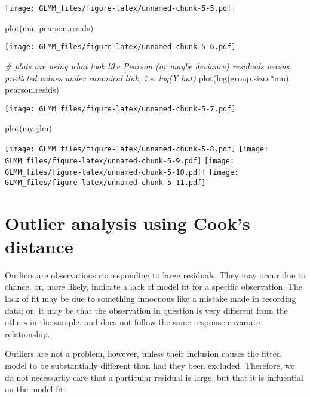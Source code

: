 \documentclass[
]{book}
\newenvironment{Shaded}{\begin{snugshade}}{\end{snugshade}}
\newcommand{\CommentTok}[1]{\textcolor[rgb]{0.56,0.35,0.01}{\textit{#1}}}
\newcommand{\FunctionTok}[1]{\textcolor[rgb]{0.00,0.00,0.00}{#1}}
\newcommand{\NormalTok}[1]{#1}
\newcommand{\SpecialCharTok}[1]{\textcolor[rgb]{0.00,0.00,0.00}{#1}}
\begin{document}
\texttt{[image: GLMM\_files/figure-latex/unnamed-chunk-5-5.pdf]}

\begin{Shaded}
\begin{Highlighting}[]
\FunctionTok{plot}\NormalTok{(mu, pearson.resids)}
\end{Highlighting}
\end{Shaded}

\texttt{[image: GLMM\_files/figure-latex/unnamed-chunk-5-6.pdf]}

\begin{Shaded}
\begin{Highlighting}[]
\CommentTok{\# plots are using what look like Pearson (or maybe deviance) residuals versus predicted values under canonical link, i.e. log(Y hat)}
\FunctionTok{plot}\NormalTok{(}\FunctionTok{log}\NormalTok{(group.sizes}\SpecialCharTok{*}\NormalTok{mu), pearson.resids)}
\end{Highlighting}
\end{Shaded}

\texttt{[image: GLMM\_files/figure-latex/unnamed-chunk-5-7.pdf]}

\begin{Shaded}
\begin{Highlighting}[]
\FunctionTok{plot}\NormalTok{(my.glm)}
\end{Highlighting}
\end{Shaded}

\texttt{[image: GLMM\_files/figure-latex/unnamed-chunk-5-8.pdf]} \texttt{[image: GLMM\_files/figure-latex/unnamed-chunk-5-9.pdf]} \texttt{[image: GLMM\_files/figure-latex/unnamed-chunk-5-10.pdf]} \texttt{[image: GLMM\_files/figure-latex/unnamed-chunk-5-11.pdf]}

\hypertarget{outlier-analysis-using-cooks-distance}{%
\section{Outlier analysis using Cook's distance}\label{outlier-analysis-using-cooks-distance}}

Outliers are observations corresponding to large residuals. They may occur due to chance, or, more likely, indicate a lack of model fit for a specific observation. The lack of fit may be due to something innocuous like a mistake made in recording data; or, it may be that the observation in question is very different from the others in the sample, and does not follow the same response-covariate relationship.

Outliers are not a problem, however, unless their inclusion causes the fitted model to be substantially different than had they been excluded. Therefore, we do not necessarily care that a particular residual is large, but that it is influential on the model fit.
\end{document}
